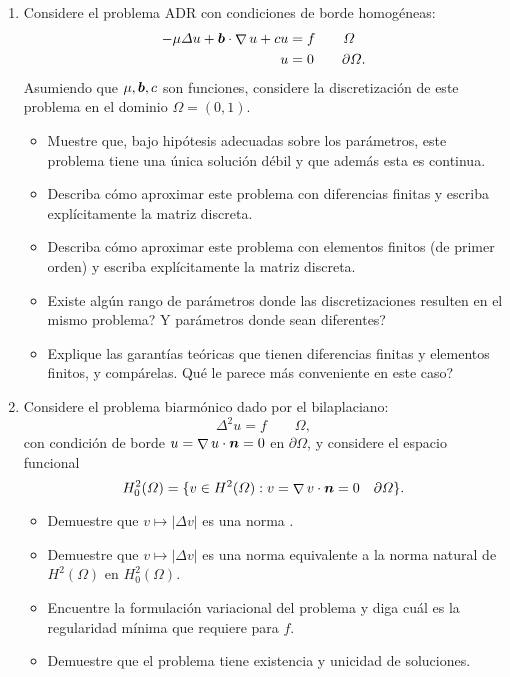 \documentclass{article}
\renewcommand{\vec}{\vectorsym}
\DeclareMathOperator{\grad}{\nabla}
\newcommand{\pts}[1]{[{\bf #1 puntos}] }
\begin{document}
\begin{enumerate}

    \item Considere el problema ADR con condiciones de borde homogéneas:
            $$ \begin{aligned}
                -\mu \Delta u + \vec b \cdot \grad u + c u &= f \qquad \Omega \\
                u &= 0 \qquad \partial\Omega.
            \end{aligned}$$
            Asumiendo que $\mu,\vec b,c$ son funciones, considere la discretización de este problema en el dominio $\Omega = (0,1)$. 
            \begin{itemize}
                \item\pts{1} Muestre que, bajo hipótesis adecuadas sobre los parámetros,  este problema tiene una única solución débil y que además esta es continua.
                \item\pts{1}Describa cómo aproximar este problema con diferencias finitas y escriba explícitamente la matriz discreta.
                \item\pts{1}Describa cómo aproximar este problema con elementos finitos (de primer orden) y escriba explícitamente la matriz discreta. 
                \item\pts{1}Existe algún rango de parámetros donde las discretizaciones resulten en el mismo problema? Y parámetros donde sean diferentes? 
                \item\pts{1}Explique las garantías teóricas que tienen diferencias finitas y elementos finitos, y compárelas. Qué le parece más conveniente en este caso? 
            \end{itemize}

    \item Considere el problema biarmónico dado por el bilaplaciano:
            $$ \Delta^2 u = f \qquad \Omega, $$
            con condición de borde $u = \grad u\cdot \vec n = 0$ en $\partial\Omega$, y considere el espacio funcional 
                $$ H_0^2(\Omega) = \{v \in H^2(\Omega): v=\grad v \cdot \vec n = 0 \quad \partial\Omega\}. $$
            \begin{itemize}
                \item\pts{1} Demuestre que $v\mapsto|\Delta v|$ es una norma .
                \item\pts{1} Demuestre que $v\mapsto|\Delta v|$ es una norma equivalente a la norma natural de $H^2(\Omega)$ en $H_0^2(\Omega)$.
                \item\pts{1} Encuentre la formulación variacional del problema y diga cuál es la regularidad mínima que requiere para $f$. 
                \item\pts{1} Demuestre que el problema tiene existencia y unicidad de soluciones. 
            \end{itemize}
        

\end{enumerate}
\end{document}
